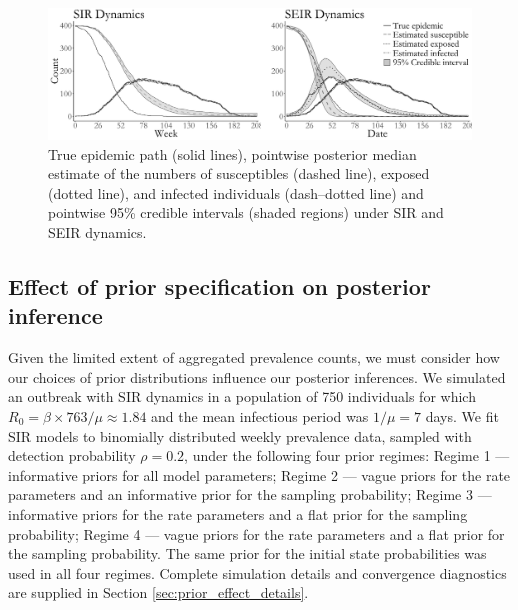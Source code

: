 \begin{figure}[!h]
	\centering
	\includegraphics[width=0.9\linewidth]{figures/misspec_latent_posts.pdf}
	\caption[Latent posterior distributions for SIR and SEIR models fit to simulated data from an SEIR model with time--varying dynamics.]{True epidemic path (solid lines), pointwise posterior median estimate of the numbers of susceptibles (dashed line), exposed (dotted line), and infected individuals (dash--dotted line) and pointwise 95\% credible intervals (shaded regions) under SIR and SEIR dynamics.}
	\label{fig:misspec_latent_posts}
\end{figure}

\subsection{Effect of prior specification on posterior inference}
\label{subsec:prior_effect_sim}
Given the limited extent of aggregated prevalence counts, we must consider how our choices of prior distributions influence our posterior inferences. We simulated an outbreak with SIR dynamics in a population of 750 individuals for which $ R_0 = \beta \times 763 / \mu \approx 1.84 $ and the mean infectious period was $ 1/\mu = 7 $ days. We fit SIR models to binomially distributed weekly prevalence data, sampled with detection probability $ \rho = 0.2$, under the following four prior regimes: Regime 1 --- informative priors for all model parameters; Regime 2 --- vague priors for the rate parameters and an informative prior for the sampling probability; Regime 3 --- informative priors for the rate parameters and a flat prior for the sampling probability; Regime 4 --- vague priors for the rate parameters and a flat prior for the sampling probability. The same prior for the initial state probabilities was used in all four regimes. Complete simulation details and convergence diagnostics are supplied in Section \ref{sec:prior_effect_details}.

